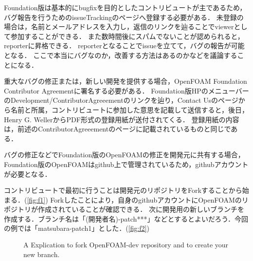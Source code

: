 \documentclass{ltjoc}
\begin{document}
Foundation版は基本的にbugfixを目的としたコントリビュートが主であるため，バグ報告を行うためのissueTrackingのページへ登録する必要がある．
未登録の場合は，名前とメールアドレスを入力し，返信のリンクを辿ることでviewerとして参加することができる．
また数時間後にスパムでないことが認められると，reporterに昇格できる．
reporterとなることでissueを立てて，バグの報告が可能となる．
ここで本当にバグなのか，改善する方法はあるのかなどを議論することになる．

重大なバグの修正または，新しい開発を提供する場合，OpenFOAM Foundation Contributor Agreementに署名する必要がある．
Foundation版HPのメニューバーのDevelopment/ContributorAgreeementのリンクを辿り，Contact Usのページから名前と所属，コントリビュートに参加した意思を記載して送信すると，後日，Henry G. WellerからPDF形式の登録用紙が送付されてくる．
登録用紙の内容は，前述のContributorAgreeementのページに記載されているものと同じである．

バグの修正などでFoundation版のOpenFOAMの修正を開発元に共有する場合，Foundation版のOpenFOAMはgithub上で管理されているため，githubアカウントが必要となる．

コントリビュートで最初に行うことは開発元のリポジトリをForkすることから始まる．(\autoref{fig:f1})
Forkしたことにより，自身のgithubアカウントにOpenFOAMのリポジトリが作成されていることが確認できる．
次に開発用の新しいブランチを作成する．ブランチ名は「(開発者名)-patch***」などとするとよいだろう．今回の例では「matsubara-patch1」とした．(\autoref{fig:f2})

\begin{figure}[htbp]
\centering
{}
\caption{A Explication to fork OpenFOAM-dev repository and to create your new branch.}
\label{fig:f1f2}
\end{figure}
\end{document}
